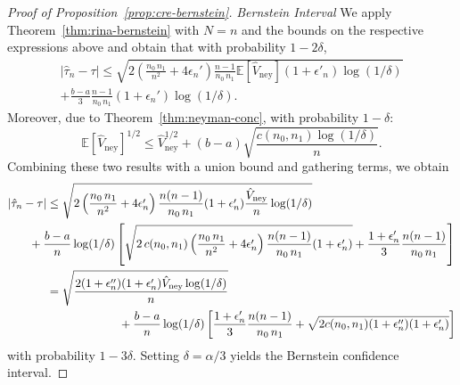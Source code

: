 \documentclass[aos]{imsart2}
\theoremstyle{plain}
\theoremstyle{definition}
\newcommand{\E}{\mathbb{E}}
\newcommand{\vhn}{\hat{V}_{\mathrm{ney}}}
\newcommand{\tauh}{\hat{\tau}}
\begin{document}
\begin{appendix}
\begin{proof}[Proof of Proposition~\ref{prop:cre-bernstein}]
    \textit{Bernstein Interval}
    We apply Theorem~\ref{thm:rina-bernstein} with $N=n$ and the bounds on the respective expressions above and obtain that with probability $1-2\delta$,
    \begin{multline*}
        \lvert \tauh_n-\tau \rvert
        \leq \sqrt{2
        \left(\frac{n_0\,n_1}{n^2}+4\epsilon_n'\right) \frac{n-1}{n_0\,n_1} \E[\vhn](1+\epsilon'_n)\log(1/\delta)}\\[-1.5ex] + \frac{b-a}{3} \frac{n-1}{n_0\,n_1}
        (1+\epsilon_n')\log(1/\delta).
    \end{multline*}
    Moreover, due to Theorem~\ref{thm:neyman-conc},
    with probability $1-\delta$:
    \begin{equation*}
 \E[\vhn]^{1/2} \leq \vhn^{1/2} +(b-a) \sqrt{\frac{c(n_0,n_1)\log(1/\delta)}{n}}.
    \end{equation*}
    Combining these two results with a union bound and gathering terms, we obtain
    \begin{align*}
        \lvert \tauh_n-\tau\rvert &\leq
        \begin{aligned}[t]
            &\sqrt{2\left(\frac{n_0\,n_1}{n^2}+4\epsilon_n'\right) \frac{n(n-1)}{n_0\,n_1}(1+\epsilon_n')\frac{\vhn}{n}
        \log(1/\delta)}\\
        &\hspace{-1cm}+\frac{b-a}{n}\log(1/\delta)\left[\sqrt{2\,c(n_0,n_1)\left(\frac{n_0\,n_1}{n^2}+4\epsilon_n'\right) \frac{n(n-1)}{n_0\,n_1}(1+\epsilon_n')}+\frac{1+\epsilon_n'}{3}\frac{n(n-1)}{n_0\,n_1}\right]
        \end{aligned}\\
        &=
        \begin{aligned}[t]
            &\sqrt{\frac{2(1+\epsilon_n'')(1+\epsilon_n')\vhn\log(1/\delta)}{n}}\\
        &\hspace{1.7cm}+ \frac{b-a}{n}\log(1/\delta)\left[\frac{1+\epsilon_n'}{3}\frac{n(n-1)}{n_0\,n_1}+\sqrt{2c(n_0,n_1)(1+\epsilon_n'')(1+\epsilon_n')}\right]
        \end{aligned}
    \end{align*}
    with probability $1-3\delta$. Setting $\delta = \alpha/3$ yields the Bernstein confidence interval.


\end{proof}
\end{appendix}
\end{document}
